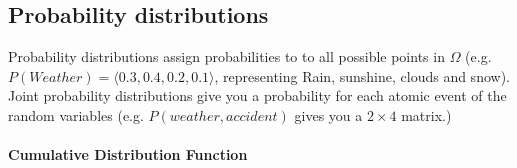 \documentclass[../main.tex]{subfiles}
\begin{document}
\subsection{Probability distributions} 
Probability distributions assign probabilities to to all possible points in $\Omega$ (e.g. $P(Weather) = \langle 0.3, 0.4, 0.2, 0.1 \rangle$, representing Rain, sunshine, clouds and snow). 
Joint probability distributions give you a probability for each atomic event of the random variables (e.g. $P(weather, accident)$ gives you a $2\times 4$  matrix.)

\paragraph{Cumulative Distribution Function} 
\end{document}
